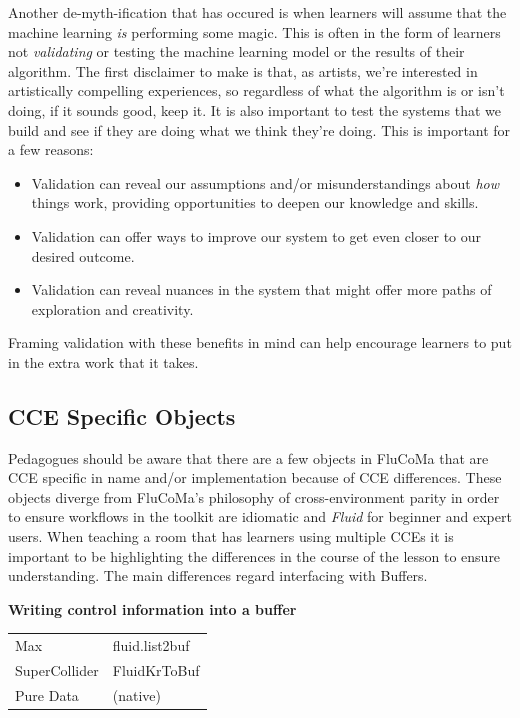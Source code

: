 \documentclass{article}
\providecommand{\tightlist}{%
  \setlength{\itemsep}{0pt}\setlength{\parskip}{0pt}}
\begin{document}
Another de-myth-ification that has occured is when learners will assume
that the machine learning \emph{is} performing some magic. This is often
in the form of learners not \emph{validating} or testing the machine
learning model or the results of their algorithm. The first disclaimer
to make is that, as artists, we're interested in artistically compelling
experiences, so regardless of what the algorithm is or isn't doing, if
it sounds good, keep it. It is also important to test the systems that
we build and see if they are doing what we think they're doing. This is
important for a few reasons:

\begin{itemize}
\tightlist
\item
  Validation can reveal our assumptions and/or misunderstandings about
  \emph{how} things work, providing opportunities to deepen our
  knowledge and skills.
\item
  Validation can offer ways to improve our system to get even closer to our
  desired outcome.
\item
  Validation can reveal nuances in the system that might offer more paths of
  exploration and creativity.
\end{itemize}

Framing validation with these benefits in mind can help encourage
learners to put in the extra work that it takes.

\subsection{CCE Specific Objects}\label{cce-specific-objects}

Pedagogues should be aware that there are a few objects in FluCoMa that
are CCE specific in name and/or implementation because of CCE
differences. These objects diverge from FluCoMa's philosophy of
cross-environment parity in order to ensure workflows in the toolkit are
idiomatic and \emph{Fluid} for beginner and expert users. When teaching a room that has learners using multiple CCEs it is important to be highlighting the differences in the course of the lesson to ensure understanding. The main differences regard interfacing with Buffers.

\textbf{Writing control information into a buffer}

\begin{longtable}{ll}
\toprule
Max & fluid.list2buf \\
SuperCollider & FluidKrToBuf \\
Pure Data & (native) \\
\bottomrule
\end{longtable}
\end{document}
